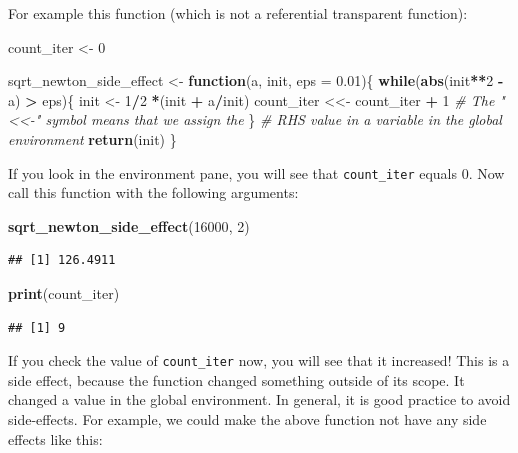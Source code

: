 \documentclass[]{gitbook}
\newenvironment{Shaded}{\begin{snugshade}}{\end{snugshade}}
\newcommand{\CommentTok}[1]{\textcolor[rgb]{0.56,0.35,0.01}{\textit{#1}}}
\newcommand{\ControlFlowTok}[1]{\textcolor[rgb]{0.13,0.29,0.53}{\textbf{#1}}}
\newcommand{\DataTypeTok}[1]{\textcolor[rgb]{0.13,0.29,0.53}{#1}}
\newcommand{\DecValTok}[1]{\textcolor[rgb]{0.00,0.00,0.81}{#1}}
\newcommand{\FloatTok}[1]{\textcolor[rgb]{0.00,0.00,0.81}{#1}}
\newcommand{\KeywordTok}[1]{\textcolor[rgb]{0.13,0.29,0.53}{\textbf{#1}}}
\newcommand{\NormalTok}[1]{#1}
\newcommand{\OperatorTok}[1]{\textcolor[rgb]{0.81,0.36,0.00}{\textbf{#1}}}
\newcommand{\StringTok}[1]{\textcolor[rgb]{0.31,0.60,0.02}{#1}}
\theoremstyle{definition}
\theoremstyle{definition}
\theoremstyle{definition}
\theoremstyle{remark}
\begin{document}
For example this function (which is not a referential transparent
function):

\begin{Shaded}
\begin{Highlighting}[]
\NormalTok{count_iter <-}\StringTok{ }\DecValTok{0}

\NormalTok{sqrt_newton_side_effect <-}\StringTok{ }\ControlFlowTok{function}\NormalTok{(a, init, }\DataTypeTok{eps =} \FloatTok{0.01}\NormalTok{)\{}
    \ControlFlowTok{while}\NormalTok{(}\KeywordTok{abs}\NormalTok{(init}\OperatorTok{**}\DecValTok{2} \OperatorTok{-}\StringTok{ }\NormalTok{a) }\OperatorTok{>}\StringTok{ }\NormalTok{eps)\{}
\NormalTok{        init <-}\StringTok{ }\DecValTok{1}\OperatorTok{/}\DecValTok{2} \OperatorTok{*}\NormalTok{(init }\OperatorTok{+}\StringTok{ }\NormalTok{a}\OperatorTok{/}\NormalTok{init)}
\NormalTok{        count_iter <<-}\StringTok{ }\NormalTok{count_iter }\OperatorTok{+}\StringTok{ }\DecValTok{1} \CommentTok{# The "<<-" symbol means that we assign the}
\NormalTok{    \}                                 }\CommentTok{# RHS value in a variable in the global environment}
    \KeywordTok{return}\NormalTok{(init)}
\NormalTok{\}}
\end{Highlighting}
\end{Shaded}

If you look in the environment pane, you will see that
\texttt{count\_iter} equals 0. Now call this function with the following
arguments:

\begin{Shaded}
\begin{Highlighting}[]
\KeywordTok{sqrt_newton_side_effect}\NormalTok{(}\DecValTok{16000}\NormalTok{, }\DecValTok{2}\NormalTok{)}
\end{Highlighting}
\end{Shaded}

\begin{verbatim}
## [1] 126.4911
\end{verbatim}

\begin{Shaded}
\begin{Highlighting}[]
\KeywordTok{print}\NormalTok{(count_iter)}
\end{Highlighting}
\end{Shaded}

\begin{verbatim}
## [1] 9
\end{verbatim}

If you check the value of \texttt{count\_iter} now, you will see that it
increased! This is a side effect, because the function changed something
outside of its scope. It changed a value in the global environment. In
general, it is good practice to avoid side-effects. For example, we
could make the above function not have any side effects like this:
\end{document}
